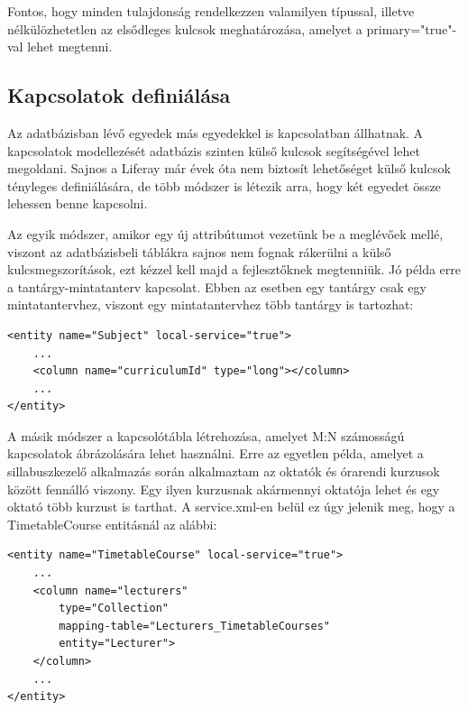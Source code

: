 \documentclass[hidelinks, 12pt, a4paper]{report}
\begin{document}
Fontos, hogy minden tulajdonság rendelkezzen valamilyen típussal, illetve nélkülözhetetlen az elsődleges kulcsok meghatározása, amelyet a primary="true"-val lehet megtenni.

\subsection{Kapcsolatok definiálása}

Az adatbázisban lévő egyedek más egyedekkel is kapcsolatban állhatnak. A kapcsolatok modellezését adatbázis szinten külső kulcsok segítségével lehet megoldani. Sajnos a Liferay már évek óta nem biztosít lehetőséget külső kulcsok tényleges definiálására, de több módszer is létezik arra, hogy két egyedet össze lehessen benne kapcsolni.

Az egyik módszer, amikor egy új attribútumot vezetünk be a meglévőek mellé, viszont az adatbázisbeli táblákra sajnos nem fognak rákerülni a külső kulcsmegszorítások, ezt kézzel kell majd a fejlesztőknek megtenniük. Jó példa erre a tantárgy-mintatanterv kapcsolat. Ebben az esetben egy tantárgy csak egy mintatantervhez, viszont egy mintatantervhez több tantárgy is tartozhat:

\begin{minipage}{\linewidth}
\begin{lstlisting}[basicstyle=\small]
<entity name="Subject" local-service="true">
	...
	<column name="curriculumId" type="long"></column>
	...
</entity>
\end{lstlisting}
\end{minipage}

A másik módszer a kapcsolótábla létrehozása, amelyet M:N számosságú kapcsolatok ábrázolására lehet használni. Erre az egyetlen példa, amelyet a sillabuszkezelő alkalmazás során alkalmaztam az oktatók és órarendi kurzusok között fennálló viszony. Egy ilyen kurzusnak akármennyi oktatója lehet és egy oktató több kurzust is tarthat. A service.xml-en belül ez úgy jelenik meg, hogy a TimetableCourse entitásnál az alábbi: 

\begin{minipage}{\linewidth}
\begin{lstlisting}[basicstyle=\small]
<entity name="TimetableCourse" local-service="true">
	...
	<column name="lecturers"
		type="Collection"
		mapping-table="Lecturers_TimetableCourses"
		entity="Lecturer">
	</column>
	...
</entity>
\end{lstlisting}
\end{minipage}
\end{document}
